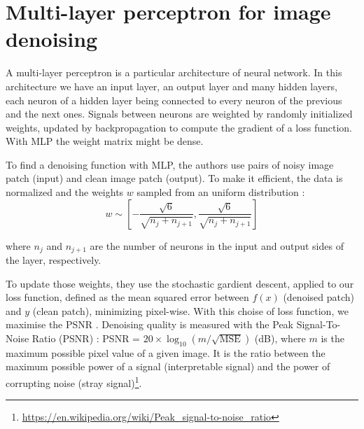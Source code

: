 \documentclass[10pt,a4paper]{article}
\newcommand{\svs}{\vspace{9pt}}
\begin{document}





\section{Multi-layer perceptron for image denoising}

A multi-layer perceptron is a particular architecture of neural network. In this architecture we have an input layer, an output layer and many hidden layers, each neuron of a hidden layer being connected to every neuron of the previous and the next ones. Signals between neurons are weighted by randomly initialized weights, updated by backpropagation to compute the gradient of a loss function. With MLP the weight matrix might be dense.

\svs

To find a denoising function with MLP, the authors use pairs of noisy image patch (input) and clean image patch (output). To make it efficient, the data is normalized and the weights $w$ sampled from an uniform distribution :  \\%
$$w \sim \left[-\frac{\sqrt{6}}{\sqrt{n_j + n_{j+1}}}, \frac{\sqrt{6}}{\sqrt{n_j + n_{j+1}}}\right]$$ 

\svs
where $n_j$ and $n_{j+1}$ are the number of neurons in the input and output sides of the layer, respectively.

\svs

To update those weights, they use the stochastic gardient descent, applied to our loss function, defined as the mean squared error between $f(x)$ (denoised patch) and $y$ (clean patch), minimizing pixel-wise. With this choise of loss function, we maximise the PSNR . %
Denoising quality is measured with the Peak Signal-To-Noise Ratio (PSNR) : PSNR = $20 \times \log_{10}(m/\sqrt{\mathrm{MSE}})$ (dB), where $m$ is the maximum possible pixel value of a given image. It is the ratio between the maximum possible power of a signal (interpretable signal) and the power of corrupting noise (stray signal)\footnote{\href{https://en.wikipedia.org/wiki/Peak\_signal-to-noise\_ratio}{https://en.wikipedia.org/wiki/Peak\_signal-to-noise\_ratio}}.
\end{document}
